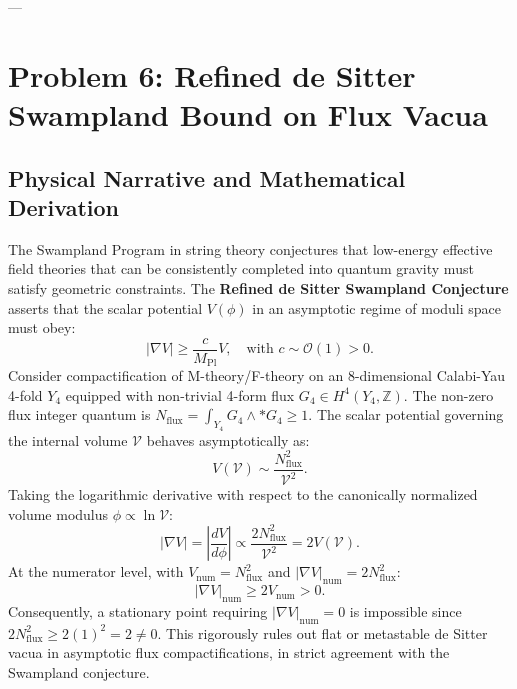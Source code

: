 \documentclass[11pt,a4paper]{article}
\begin{document}
---

\section{Problem 6: Refined de Sitter Swampland Bound on Flux Vacua}

\subsection{Physical Narrative and Mathematical Derivation}
The Swampland Program in string theory conjectures that low-energy effective field theories that can be consistently completed into quantum gravity must satisfy geometric constraints. The \textbf{Refined de Sitter Swampland Conjecture} asserts that the scalar potential $V(\phi)$ in an asymptotic regime of moduli space must obey:
\begin{equation}
    |\nabla V| \ge \frac{c}{M_{\mathrm{Pl}}} V, \quad \text{with } c \sim \mathcal{O}(1) > 0.
\end{equation}
Consider compactification of M-theory/F-theory on an 8-dimensional Calabi-Yau 4-fold $Y_4$ equipped with non-trivial 4-form flux $G_4 \in H^4(Y_4, \mathbb{Z})$. The non-zero flux integer quantum is $N_{\mathrm{flux}} = \int_{Y_4} G_4 \wedge *G_4 \ge 1$. The scalar potential governing the internal volume $\mathcal{V}$ behaves asymptotically as:
\begin{equation}
    V(\mathcal{V}) \sim \frac{N_{\mathrm{flux}}^2}{\mathcal{V}^2}.
\end{equation}
Taking the logarithmic derivative with respect to the canonically normalized volume modulus $\phi \propto \ln \mathcal{V}$:
\begin{equation}
    |\nabla V| = \left| \frac{dV}{d\phi} \right| \propto \frac{2 N_{\mathrm{flux}}^2}{\mathcal{V}^2} = 2 V(\mathcal{V}).
\end{equation}
At the numerator level, with $V_{\mathrm{num}} = N_{\mathrm{flux}}^2$ and $|\nabla V|_{\mathrm{num}} = 2 N_{\mathrm{flux}}^2$:
\begin{equation}
    |\nabla V|_{\mathrm{num}} \ge 2 V_{\mathrm{num}} > 0.
\end{equation}
Consequently, a stationary point requiring $|\nabla V|_{\mathrm{num}} = 0$ is impossible since $2 N_{\mathrm{flux}}^2 \ge 2(1)^2 = 2 \ne 0$. This rigorously rules out flat or metastable de Sitter vacua in asymptotic flux compactifications, in strict agreement with the Swampland conjecture.
\end{document}
